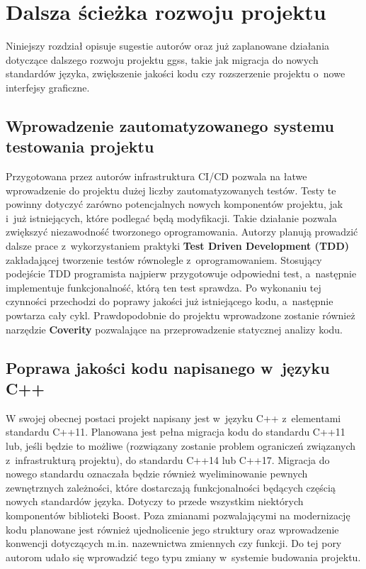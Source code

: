 \chapter{Dalsza ścieżka rozwoju projektu}
\label{cha:dalsze}
Niniejszy rozdział opisuje sugestie autorów oraz już zaplanowane działania dotyczące dalszego rozwoju projektu \gls*{ggss}, takie jak migracja do nowych standardów języka, zwiększenie jakości kodu czy rozszerzenie projektu o~nowe interfejsy graficzne.

\section{Wprowadzenie zautomatyzowanego systemu testowania projektu}
Przygotowana przez autorów infrastruktura CI/CD pozwala na łatwe wprowadzenie do projektu dużej liczby zautomatyzowanych testów. Testy te powinny dotyczyć zarówno potencjalnych nowych komponentów projektu, jak i~już istniejących, które podlegać będą modyfikacji. Takie działanie pozwala zwiększyć niezawodność tworzonego oprogramowania. Autorzy planują prowadzić dalsze prace z~wykorzystaniem praktyki \textbf{Test Driven Development (TDD)} zakładającej tworzenie testów równolegle z~oprogramowaniem. Stosujący podejście TDD programista najpierw przygotowuje odpowiedni test, a~następnie implementuje funkcjonalność, którą ten test sprawdza. Po wykonaniu tej czynności przechodzi do poprawy jakości już istniejącego kodu, a~następnie powtarza cały cykl. Prawdopodobnie do projektu wprowadzone zostanie również narzędzie \textbf{Coverity} pozwalające na przeprowadzenie statycznej analizy kodu.

\section{Poprawa jakości kodu napisanego w~języku C++}
W swojej obecnej postaci projekt napisany jest w~języku C++ z~elementami standardu C++11. Planowana jest pełna migracja kodu do standardu C++11 lub, jeśli będzie to możliwe (rozwiązany zostanie problem ograniczeń związanych z~infrastrukturą projektu), do standardu C++14 lub C++17. Migracja do nowego standardu oznaczała będzie również wyeliminowanie pewnych zewnętrznych zależności, które dostarczają funkcjonalności będących częścią nowych standardów języka. Dotyczy to przede wszystkim niektórych komponentów biblioteki Boost. Poza zmianami pozwalającymi na modernizację kodu planowane jest również ujednolicenie jego struktury oraz wprowadzenie konwencji dotyczących m.in. nazewnictwa zmiennych czy funkcji. Do tej pory autorom udało się wprowadzić tego typu zmiany w~systemie budowania projektu. 

